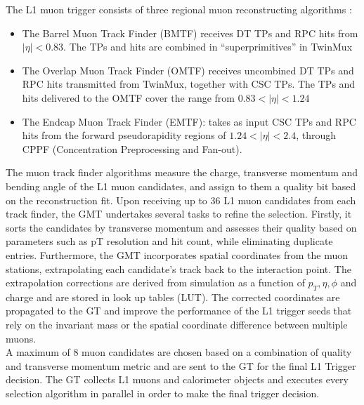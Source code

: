 The L1 muon trigger consists of three regional muon reconstructing algorithms \cite{Fulcher:2302108,Jeitler:2165960}:
\begin{itemize}
    \item The Barrel Muon Track Finder (BMTF) receives DT TPs and RPC hits from $|\eta| < 0.83$. The TPs and hits are combined in “superprimitives” in TwinMux
    \item The Overlap Muon Track Finder (OMTF) receives uncombined DT TPs and RPC hits transmitted from TwinMux, together with CSC TPs. The TPs and hits delivered to the OMTF cover the range from $0.83 < |\eta| < 1.24$
    \item The Endcap Muon Track Finder (EMTF): takes as input CSC TPs and RPC hits from the forward pseudorapidity regions of $1.24 < |\eta| < 2.4$, through CPPF (Concentration Preprocessing and Fan-out).
\end{itemize}
\indent The muon track finder algorithms measure the charge, transverse momentum and bending angle of the L1 muon candidates, and assign to them a quality bit based on the reconstruction fit. Upon receiving up to 36 L1 muon candidates from each track finder, the GMT undertakes several tasks to refine the selection. Firstly, it sorts the candidates by transverse momentum and assesses their quality based on parameters such as pT resolution and hit count, while eliminating duplicate entries. Furthermore, the GMT incorporates spatial coordinates from the muon stations, extrapolating each candidate's track back to the interaction point. The extrapolation corrections are derived from simulation as a function of $p_{T} , \eta, \phi$ and charge and are stored in look up tables (LUT). The corrected coordinates are propagated to the GT and improve the performance of the L1 trigger seeds that rely on the invariant mass or the spatial coordinate difference between multiple muons.\\
\indent A maximum of 8 muon candidates are chosen based on a combination of quality and transverse momentum metric and are sent to the GT for the final L1 Trigger decision. The GT collects L1 muons and calorimeter objects and executes every selection algorithm in parallel in order to make the final trigger decision.

